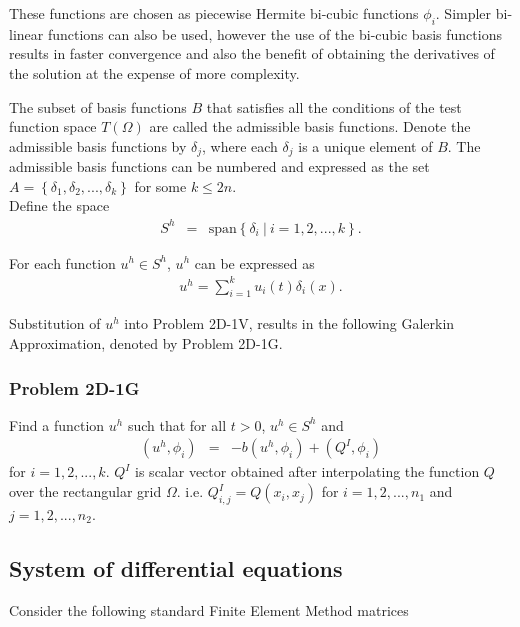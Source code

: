 \documentclass[../../main.tex]{subfiles}
\begin{document}
These functions are chosen as piecewise Hermite bi-cubic functions $\phi_i$. Simpler bi-linear functions can also be used, however the use of the bi-cubic basis functions results in faster convergence and also the benefit of obtaining the derivatives of the solution at the expense of more complexity.

The subset of basis functions $B$ that satisfies all the conditions of the test function space $T(\Omega)$ are called the admissible basis functions. Denote the admissible basis functions by $\delta_j$, where each $\delta_j$ is a unique element of $B$. The admissible basis functions can be numbered and expressed as the set $A = \left \{\delta_1, \delta_2,..., \delta_k \right\}$ for some $k \leq 2n$.\\ 

Define the space
\begin{eqnarray*}
S^h & = & \textrm{span}\left\{\delta_i \ | \ i = 1,2,...,k \right\}.
\end{eqnarray*}

For each function $u^h \in S^h$, $u^h$ can be expressed as
\begin{eqnarray*}
	u^h = \sum_{i = 1}^{k} u_i(t) \delta_{i}(x).
\end{eqnarray*}

Substitution of $u^h$ into Problem 2D-1V, results in the following Galerkin Approximation, denoted by Problem 2D-1G.

\subsubsection{Problem 2D-1G}
Find a function $u^h$ such that for all $t>0$, $u^h \in S^h$ and
\begin{eqnarray*}
	(u^h, \phi_i) & = & -b(u^h,\phi_i) + (Q^I, \phi_i)
\end{eqnarray*} for $i = 1,2,...,k$. $Q^I$ is scalar vector obtained after interpolating the function $Q$ over the rectangular grid $\Omega$. i.e. $Q^I_{i,j} = Q(x_i,x_j)$ for $i = 1,2,...,n_1$ and $j = 1,2,...,n_2$.

\subsection{System of differential equations}\label{ssec:2DFEM:DE}

Consider the following standard Finite Element Method matrices
\end{document}
